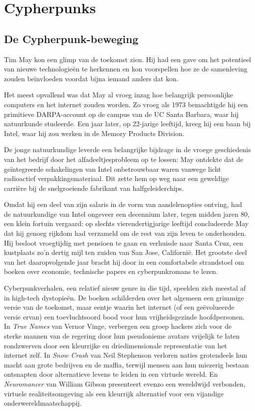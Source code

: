 \documentclass[smalldemyvopaper,11pt,twoside,onecolumn,openright,extrafontsizes,hidelinks]{memoir}
\begin{document}
\part{Cypherpunks}

\chapter{De Cypherpunk-beweging}\label{de-cypherpunk-beweging}

Tim May kon een glimp van de toekomst zien. Hij had een gave om het
potentieel van nieuwe technologieën te herkennen en kon voorspellen hoe
ze de samenleving zouden beïnvloeden voordat bijna iemand anders dat
kon.

Het meest opvallend was dat May al vroeg inzag hoe belangrijk
persoonlijke computers en het internet zouden worden. Zo vroeg als 1973
bemachtigde hij een primitieve DARPA-account op de campus van de UC
Santa Barbara, waar hij natuurkunde studeerde. Een jaar later, op
22-jarige leeftijd, kreeg hij een baan bij Intel, waar hij zou werken in
de Memory Products Division.

De jonge natuurkundige leverde een belangrijke bijdrage in de vroege
geschiedenis van het bedrijf door het alfadeeltjesprobleem op te lossen:
May ontdekte dat de geïntegreerde schakelingen van Intel onbetrouwbaar
waren vanwege licht radioactief verpakkingsmateriaal. Dit zette hem op
weg naar een geweldige carrière bij de snelgroeiende fabrikant van
halfgeleiderchips.

Omdat hij een deel van zijn salaris in de vorm van aandelenopties
ontving, had de natuurkundige van Intel ongeveer een decennium later,
tegen midden jaren 80, een klein fortuin vergaard: op slechts
vierendertigjarige leeftijd concludeerde May dat hij genoeg rijkdom had
verzameld om de rest van zijn leven te onderhouden. Hij besloot
vroegtijdig met pensioen te gaan en verhuisde naar Santa Cruz, een
kustplaats zo'n dertig mijl ten zuiden van San Jose, Californië. Het
grootste deel van het daaropvolgende jaar bracht hij door in een
comfortabele strandstoel om boeken over economie, technische papers en
cyberpunkromans te lezen.

Cyberpunkverhalen, een relatief nieuw genre in die tijd, speelden zich
meestal af in high-tech dystopieën. De boeken schilderden over het
algemeen een grimmige versie van de toekomst, maar eentje waarin het
internet (of een geëvolueerde versie ervan) een toevluchtsoord bood voor
hun vrijheidsgezinde hoofdpersonen. In \emph{True Names} van Vernor
Vinge, verbergen een groep hackers zich voor de sterke mannen van de
regering door hun pseudonieme avatars vrijelijk te laten rondzwerven
door een kleurrijke en driedimensionale representatie van het internet
zelf. In \emph{Snow Crash} van Neil Stephenson verloren naties
grotendeels hun macht aan grote bedrijven en de maffia, terwijl mensen
aan hun miezerig bestaan ontsnapten door alternatieve levens te leiden
in een virtuele wereld. En \emph{Neuromancer} van William Gibson
presenteert evenzo een wereldwijd verbonden, virtuele realiteitsomgeving
als een kleurrijk alternatief voor een vijandige
onderwereldmaatschappij.
\end{document}
